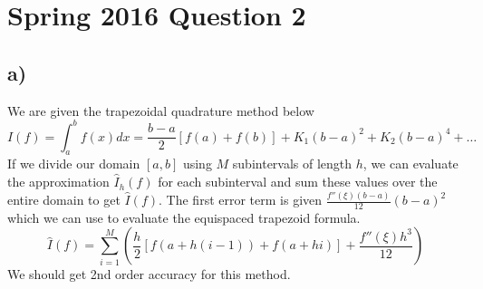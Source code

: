 \documentclass[12pt]{article}
\begin{document}
\section*{Spring 2016 Question 2}

\subsection*{a)} 
We are given the trapezoidal quadrature method below
\begin{equation*}
I(f) = \int_a^b f(x) dx = \dfrac{b-a}{2} \left[f(a) + f(b)\right] + K_1(b-a)^2 +
K_2(b-a)^4 + \dots
\end{equation*}
If we divide our domain $[a,b]$ using $M$ subintervals of length $h$, we can
evaluate the approximation $\hat{I}_h(f)$ for each subinterval and sum these
values over the entire domain to get $\hat{I}(f)$. The first error term is given
$\frac{f''(\xi)(b-a)}{12}(b-a)^2$ which we can use to evaluate the equispaced
trapezoid formula.
\begin{equation*}
\hat{I}(f) = \sum_{i=1}^{M} \left( \dfrac{h}{2} \left[f(a+h(i-1)) +
f(a+hi)\right] + \dfrac{f''(\xi)h^3}{12} \right)
\end{equation*}
We should get 2nd order accuracy for this method.
\end{document}
